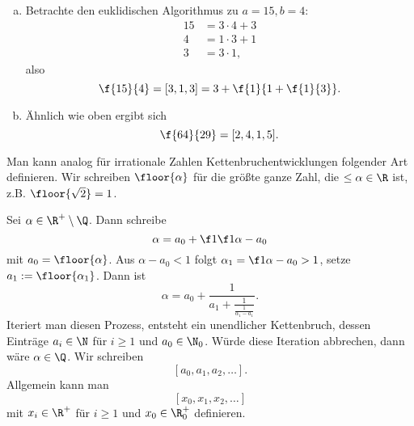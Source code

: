 \begin{ex} \label{6.2}
	\begin{enumerate}[a)]
		\item
			Betrachte den euklidischen Algorithmus zu $a = 15, b = 4$:
			\begin{align*}
				15 &= 3 \cdot 4 + 3 \\
				4 &= 1 \cdot 3 + 1 \\
				3 &= 3 \cdot 1,
			\end{align*}
			also
			\[
				\f {15}{4} = [3, 1, 3] = 3 + \f {1}{1 + \f{1}{3}}.
			\]
		\item
			Ähnlich wie oben ergibt sich
			\[
				\f {64}{29} = [2, 4, 1, 5].
			\]
	\end{enumerate}
\end{ex}

\begin{nt} \label{6.3}
	Man kann analog für irrationale Zahlen Kettenbruchentwicklungen folgender Art definieren.
	Wir schreiben $\floor{\alpha}$ für die größte ganze Zahl, die $\le \alpha \in \R$ ist, z.B. $\floor{\sqrt 2} = 1$.

	Sei $\alpha \in \R^+ \setminus \Q$.
	Dann schreibe
	\[
		\alpha = a_0 + \f 1{\f 1{\alpha - a_0}}
	\]
	mit $a_0 = \floor{\alpha}$.
	Aus $\alpha - a_0 < 1$ folgt $\alpha_1 = \f 1{\alpha - a_0} > 1$, setze $a_1 := \floor{\alpha_1}$.
	Dann ist
	\[
		\alpha = a_0 + \dfrac 1{a_1 + \frac 1{\frac 1{\alpha_1 - a_1}}}.
	\]
	Iteriert man diesen Prozess, entsteht ein unendlicher Kettenbruch, dessen Einträge $a_i \in \N$ für $i \ge 1$ und $a_0 \in \N_0$.
	Würde diese Iteration abbrechen, dann wäre $\alpha \in \Q$.
	Wir schreiben
	\[
		[a_0, a_1, a_2, \dotsc].
	\]
	Allgemein kann man
	\[
		[x_0, x_1, x_2, \dotsc]
	\]
	mit $x_i \in \R^+$ für $i \ge 1$ und $x_0 \in \R_0^+$ definieren.
\end{nt}

